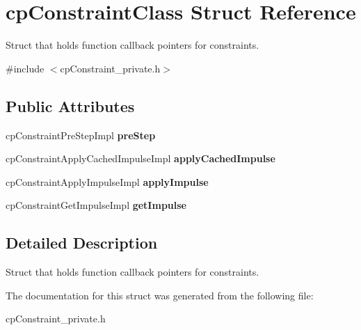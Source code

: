 \hypertarget{structcp_constraint_class}{}\section{cp\+Constraint\+Class Struct Reference}
\label{structcp_constraint_class}


Struct that holds function callback pointers for constraints.  




{\ttfamily \#include $<$cp\+Constraint\+\_\+private.\+h$>$}

\subsection*{Public Attributes}
\begin{DoxyCompactItemize}
\item 
\hypertarget{structcp_constraint_class_a0424d3d9d2ea5c12ad70fbbfc5400e64}{}cp\+Constraint\+Pre\+Step\+Impl {\bfseries pre\+Step}\label{structcp_constraint_class_a0424d3d9d2ea5c12ad70fbbfc5400e64}

\item 
\hypertarget{structcp_constraint_class_a63a5a24947dcc70b3a3c145efb765cdb}{}cp\+Constraint\+Apply\+Cached\+Impulse\+Impl {\bfseries apply\+Cached\+Impulse}\label{structcp_constraint_class_a63a5a24947dcc70b3a3c145efb765cdb}

\item 
\hypertarget{structcp_constraint_class_aaf394b027a670164f6453a85dfa13eb4}{}cp\+Constraint\+Apply\+Impulse\+Impl {\bfseries apply\+Impulse}\label{structcp_constraint_class_aaf394b027a670164f6453a85dfa13eb4}

\item 
\hypertarget{structcp_constraint_class_a3702fa721f9c2ccabf32eb81339fd8dc}{}cp\+Constraint\+Get\+Impulse\+Impl {\bfseries get\+Impulse}\label{structcp_constraint_class_a3702fa721f9c2ccabf32eb81339fd8dc}

\end{DoxyCompactItemize}


\subsection{Detailed Description}
Struct that holds function callback pointers for constraints. 

The documentation for this struct was generated from the following file\+:\begin{DoxyCompactItemize}
\item 
cp\+Constraint\+\_\+private.\+h\end{DoxyCompactItemize}
